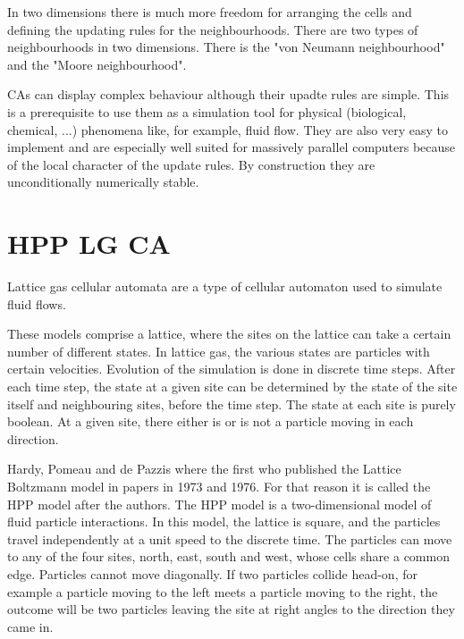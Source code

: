 \documentclass[paper=a4, fontsize=11pt]{scrartcl} %
\numberwithin{equation}{section} %
\numberwithin{figure}{section} %
\numberwithin{table}{section} %
\begin{document}
In two dimensions there is much more freedom for arranging the cells and defining the updating rules for the neighbourhoods. There are two types of neighbourhoods in two dimensions. There is the "von Neumann neighbourhood" and the "Moore neighbourhood".

CAs can display complex behaviour although their upadte rules are simple. This is a prerequisite to use them as a simulation tool for physical (biological, chemical, ...) phenomena like, for example, fluid flow. They are also very easy to implement and are especially well suited for massively parallel computers because of the local character of the update rules. By construction they are unconditionally numerically stable. \cite{LGCA}


\section{HPP LG CA}
Lattice gas cellular automata are a type of cellular automaton used to simulate fluid flows.

These models comprise a lattice, where the sites on the lattice can take a certain number of different states. In lattice gas, the various states are particles with certain velocities. Evolution of the simulation is done in discrete time steps. After each time step, the state at a given site can be determined by the state of the site itself and neighbouring sites, before the time step.
The state at each site is purely boolean. At a given site, there either is or is not a particle moving in each direction.

Hardy, Pomeau and de Pazzis where the first who published the Lattice Boltzmann model in papers in 1973 and 1976. For that reason it is called the HPP model after the authors. The HPP model is a two-dimensional model of fluid particle interactions. In this model, the lattice is square, and the particles travel independently at a unit speed to the discrete time. The particles can move to any of the four sites, north, east, south and west, whose cells share a common edge. Particles cannot move diagonally.
If two particles collide head-on, for example a particle moving to the left meets a particle moving to the right, the outcome will be two particles leaving the site at right angles to the direction they came in. \cite{wiki-lg}
\end{document}

